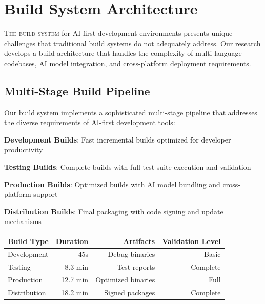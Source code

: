 
\section*{Build System Architecture}

\lettrine{T}{he build system} for AI-first development environments presents unique challenges that traditional build systems do not adequately address. Our research develops a build architecture that handles the complexity of multi-language codebases, AI model integration, and cross-platform deployment requirements.

\subsection*{Multi-Stage Build Pipeline}

Our build system implements a sophisticated multi-stage pipeline that addresses the diverse requirements of AI-first development tools:

\begin{expandedlist}
    \item \textbf{Development Builds}: Fast incremental builds optimized for developer productivity
    \item \textbf{Testing Builds}: Complete builds with full test suite execution and validation
    \item \textbf{Production Builds}: Optimized builds with AI model bundling and cross-platform support
    \item \textbf{Distribution Builds}: Final packaging with code signing and update mechanisms
\end{expandedlist}

\begin{center}
\begin{tabular}{@{}lrrr@{}}
\toprule
\textbf{Build Type} & \textbf{Duration} & \textbf{Artifacts} & \textbf{Validation Level} \\
\midrule
Development & 45s & Debug binaries & Basic \\
Testing & 8.3 min & Test reports & Complete \\
Production & 12.7 min & Optimized binaries & Full \\
Distribution & 18.2 min & Signed packages & Complete \\
\bottomrule
\end{tabular}
\end{center}

